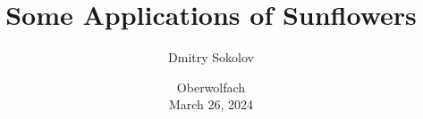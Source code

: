 

\titlegraphic{
    
}


\title[]{
    Some Applications of Sunflowers
}

\author{
    Dmitry Sokolov
}  


\date{
    Oberwolfach\\
    March 26, 2024
}






    \maketitle

    
    
    
    

